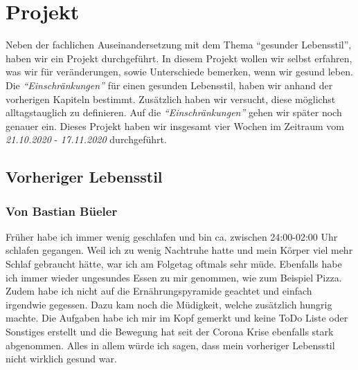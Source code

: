 \chapter{Projekt}
\authortoc{\dario}{\chapterident}
Neben der fachlichen Auseinandersetzung mit dem Thema “gesunder Lebensstil”, haben wir ein Projekt durchgeführt. In diesem Projekt wollen wir selbst erfahren, was wir für veränderungen, sowie Unterschiede bemerken, wenn wir gesund leben. Die \textit{“Einschränkungen”} für einen gesunden Lebensstil, haben wir anhand der vorherigen Kapiteln bestimmt. Zusätzlich haben wir versucht, diese möglichst alltagstauglich zu definieren. Auf die \textit{“Einschränkungen”} gehen wir später noch genauer ein. Dieses Projekt haben wir insgesamt vier Wochen im Zeitraum vom \textit{21.10.2020} - \textit{17.11.2020} durchgeführt.
\section{Vorheriger Lebensstil}
\subsection{Von Bastian Büeler}
\authortoc{\bastian}{\subsectionident}
Früher habe ich immer wenig geschlafen und bin ca. zwischen 24:00-02:00 Uhr schlafen gegangen. Weil ich zu wenig Nachtruhe hatte und mein Körper viel mehr Schlaf gebraucht hätte, war ich am Folgetag oftmals sehr müde. Ebenfalls habe ich immer wieder ungesundes Essen zu mir genommen, wie zum Beispiel Pizza. Zudem habe ich nicht auf die Ernährungspyramide geachtet und einfach irgendwie gegessen. Dazu kam noch die Müdigkeit, welche zusätzlich hungrig machte. Die Aufgaben habe ich mir im Kopf gemerkt und keine ToDo Liste oder Sonstiges erstellt und die Bewegung hat seit der Corona Krise ebenfalls stark abgenommen. Alles in allem würde ich sagen, dass mein vorheriger Lebensstil nicht wirklich gesund war.
